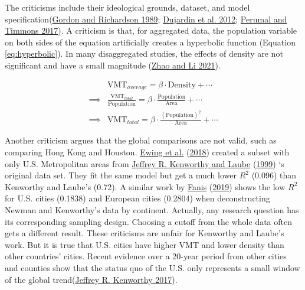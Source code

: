 \documentclass[
  11pt,
  openany]{memoir}
\begin{document}
The criticisms include their ideological grounds, dataset, and model specification(\protect\hyperlink{ref-gordonGasolineConsumptionCities1989}{Gordon and Richardson 1989}; \protect\hyperlink{ref-dujardinHometoworkCommutingUrban2012}{Dujardin et al. 2012}; \protect\hyperlink{ref-perumalContextualDensityUS2017}{Perumal and Timmons 2017}). A criticism is that, for aggregated data, the population variable on both sides of the equation artificially creates a hyperbolic function (Equation \eqref{eq:hyperbolic}). In many disaggregated studies, the effects of density are not significant and have a small magnitude (\protect\hyperlink{ref-zhaoRethinkingDeterminantsVehicle2021}{Zhao and Li 2021}).

\begin{equation}
\begin{split}
 & \text{VMT}_{average}  =\beta\cdot  \text{Density}  +\cdots\\ 
\implies & \frac{\text{VMT}_{total}}{\text{Population}}  = \beta\cdot  \frac{\text{Population}}{\text{Area}}  +\cdots\\
\implies & \text{VMT}_{total} = \beta\cdot  \frac{(\text{Population})^2}{\text{Area}}  +\cdots
\end{split}
\label{eq:hyperbolic}
\end{equation}

Another criticism argues that the global comparisons are not valid, such as comparing Hong Kong and Houston. \protect\hyperlink{ref-ewingTestingNewmanKenworthy2018}{Ewing et al.} (\protect\hyperlink{ref-ewingTestingNewmanKenworthy2018}{2018}) created a subset with only U.S. Metropolitan areas from \protect\hyperlink{ref-kenworthyPatternsAutomobileDependence1999}{Jeffrey R. Kenworthy and Laube} (\protect\hyperlink{ref-kenworthyPatternsAutomobileDependence1999}{1999}) `s original data set. They fit the same model but get a much lower \(R^2\) (0.096) than Kenworthy and Laube's (0.72). A similar work by \protect\hyperlink{ref-fanisThreeStudiesThat2019}{Fanis} (\protect\hyperlink{ref-fanisThreeStudiesThat2019}{2019}) shows the low \(R^2\) for U.S. cities (0.1838) and European cities (0.2804) when deconstructing Newman and Kenworthy's data by continent. Actually, any research question has its corresponding sampling design. Choosing a cutoff from the whole data often gets a different result. These criticisms are unfair for Kenworthy and Laube's work. But it is true that U.S. cities have higher VMT and lower density than other countries' cities. Recent evidence over a 20-year period from other cities and counties show that the status quo of the U.S. only represents a small window of the global trend(\protect\hyperlink{ref-kenworthyAutomobileDependenceEmerging2017}{Jeffrey R. Kenworthy 2017}).
\end{document}
